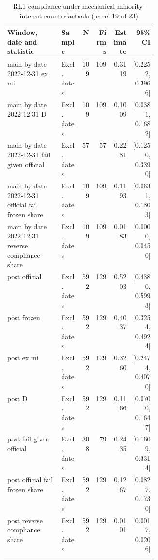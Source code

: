 \begin{table}[!htbp]\centering\scriptsize
\caption{RL1 compliance under mechanical minority-interest counterfactuals (panel 19 of 23)}
\begin{threeparttable}
\begin{tabular}{p{0.36\linewidth}lrrrr}
\toprule
Window, date and statistic & Sample & N & Firms & Estimate & 95\% CI \\
\midrule
main by date 2022-12-31 ex mi & Excl. dates & 109 & 109 & 0.3119 & [0.2252, 0.3966] \\
main by date 2022-12-31 D & Excl. dates & 109 & 109 & 0.1009 & [0.0381, 0.1682] \\
main by date 2022-12-31 fail given official & Excl. dates & 57 & 57 & 0.2281 & [0.1250, 0.3390] \\
main by date 2022-12-31 official fail frozen share & Excl. dates & 109 & 109 & 0.1193 & [0.0631, 0.1803] \\
main by date 2022-12-31 reverse compliance share & Excl. dates & 109 & 109 & 0.0183 & [0.0000, 0.0450] \\
post  official & Excl. dates & 592 & 129 & 0.5203 & [0.4380, 0.5993] \\
post  frozen & Excl. dates & 592 & 129 & 0.4037 & [0.3254, 0.4924] \\
post  ex mi & Excl. dates & 592 & 129 & 0.3260 & [0.2474, 0.4070] \\
post  D & Excl. dates & 592 & 129 & 0.1166 & [0.0700, 0.1647] \\
post  fail given official & Excl. dates & 308 & 79 & 0.2435 & [0.1609, 0.3314] \\
post  official fail frozen share & Excl. dates & 592 & 129 & 0.1267 & [0.0827, 0.1730] \\
post  reverse compliance share & Excl. dates & 592 & 129 & 0.0101 & [0.0017, 0.0206] \\
\bottomrule
\end{tabular}
\begin{tablenotes}[flushleft]\footnotesize

\end{tablenotes}
\end{threeparttable}
\end{table}
